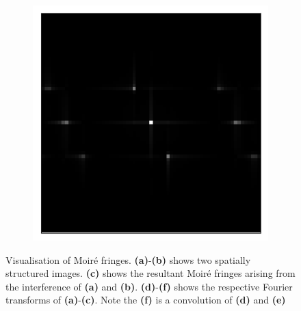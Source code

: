 \begin{figure}[h]
\begin{subfigure}[t]{0.3\textwidth}
		\caption{}
		\label{fig:fringes_moire_ft_kx_5_ky_10}
	\end{subfigure}
	\begin{subfigure}[t]{0.3\textwidth}
		\centering
		\includegraphics[width=\linewidth]{images/fringes_moire_ft_kx_25_and_5_ky_0_and_10.png}
		\caption{}
		\label{fig:fringes_moire_ft_kx_40_and_5_ky_0_and_10}
	\end{subfigure}
	\caption[Visualisation of Moir\'{e} fringes]{Visualisation of Moir\'{e} 
		fringes. \textbf{(a)}-\textbf{(b)} shows two spatially structured images. 
		\textbf{(c)} shows the resultant Moir\'{e} fringes arising from the 
		interference of \textbf{(a)} and \textbf{(b)}. \textbf{(d)}-\textbf{(f)} 
		shows the respective Fourier transforms of \textbf{(a)}-\textbf{(c)}. 
		Note the \textbf{(f)} is a convolution of \textbf{(d)} and \textbf{(e)}}
	\label{fig:moire_visualisation}
\end{figure}

